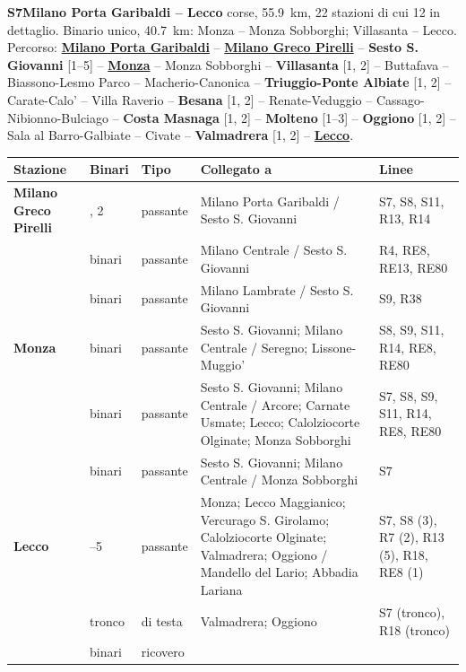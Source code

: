 \medskip\noindent\hypertarget{lin:S7}{\textbf{S7\enspace Milano Porta Garibaldi -- Lecco}} corse, \SI{55,9}{\km}, 22 stazioni di cui 12 in dettaglio. Binario unico, \SI{40,7}{\km}: Monza -- Monza Sobborghi; Villasanta -- Lecco. Percorso: \hyperlink{sta:S01645}{\textbf{Milano Porta Garibaldi}} -- \hyperlink{sta:S01326}{\textbf{Milano Greco Pirelli}} -- \hypertarget{sta:S01325}{\textbf{Sesto S. Giovanni}} [1--5] -- \hyperlink{sta:S01322}{\textbf{Monza}} -- Monza Sobborghi -- \hypertarget{sta:S01481}{\textbf{Villasanta}} [1, 2] -- Buttafava -- Biassono-Lesmo Parco -- Macherio-Canonica -- \hypertarget{sta:S01485}{\textbf{Triuggio-Ponte Albiate}} [1, 2] -- Carate-Calo' -- Villa Raverio -- \hypertarget{sta:S01488}{\textbf{Besana}} [1, 2] -- Renate-Veduggio -- Cassago-Nibionno-Bulciago -- \hypertarget{sta:S01491}{\textbf{Costa Masnaga}} [1, 2] -- \hypertarget{sta:S01458}{\textbf{Molteno}} [1--3] -- \hypertarget{sta:S01460}{\textbf{Oggiono}} [1, 2] -- Sala al Barro-Galbiate -- Civate -- \hypertarget{sta:S01463}{\textbf{Valmadrera}} [1, 2] -- \hyperlink{sta:S01520}{\textbf{Lecco}}.
{\footnotesize\setlength{\LTpre}{2pt}\setlength{\LTpost}{0pt}
\begin{longtable}{@{}>{\raggedright\arraybackslash}p{}>{\raggedright\arraybackslash}p{}>{\raggedright\arraybackslash}p{}>{\raggedright\arraybackslash}p{}>{\raggedright\arraybackslash}p{}@{}}
\toprule
Stazione & Binari & Tipo & Collegato a & Linee \\
\midrule
\endhead
\leavevmode\hypertarget{sta:S01326}{}\textbf{Milano Greco Pirelli} & 1, 2 & passante & Milano Porta Garibaldi / Sesto S. Giovanni & S7, S8, S11, R13, R14 \\
 & 2 binari & passante & Milano Centrale / Sesto S. Giovanni & R4, RE8, RE13, RE80 \\
 & 2 binari & passante & Milano Lambrate / Sesto S. Giovanni & S9, R38 \\
\leavevmode\hypertarget{sta:S01322}{}\textbf{Monza} & 3 binari & passante & Sesto S. Giovanni; Milano Centrale / Seregno; Lissone-Muggio' & S8, S9, S11, R14, RE8, RE80 \\
 & 3 binari & passante & Sesto S. Giovanni; Milano Centrale / Arcore; Carnate Usmate; Lecco; Calolziocorte Olginate; Monza Sobborghi & S7, S8, S9, S11, R14, RE8, RE80 \\
 & 1 binari & passante & Sesto S. Giovanni; Milano Centrale / Monza Sobborghi & S7 \\
\leavevmode\hypertarget{sta:S01520}{}\textbf{Lecco} & 1--5 & passante & Monza; Lecco Maggianico; Vercurago S. Girolamo; Calolziocorte Olginate; Valmadrera; Oggiono / Mandello del Lario; Abbadia Lariana & S7, S8 (3), R7 (2), R13 (5), R18, RE8 (1) \\
 & tronco & di testa & Valmadrera; Oggiono & S7 (tronco), R18 (tronco) \\
 & 19 binari & ricovero & & \\
\bottomrule
\end{longtable}}

